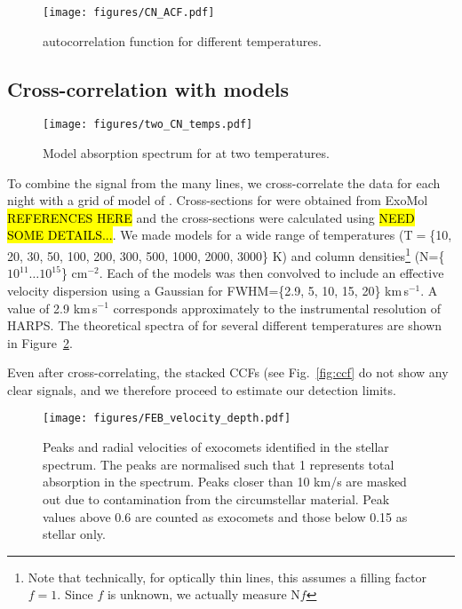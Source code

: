 \documentclass{aa}
\begin{document}
\begin{figure}
    \begin{centering}
        \texttt{[image: figures/CN\_ACF.pdf]}
        \caption{ autocorrelation function for different temperatures.}
        \label{fig:CN_ACF}
    \end{centering}
\end{figure}

\subsection{Cross-correlation with  models}\label{sect:CCF}


\begin{figure}
    \begin{centering}
        \texttt{[image: figures/two\_CN\_temps.pdf]}
        \caption{Model absorption spectrum for  at two temperatures.}
        \label{fig:CN_theory}
    \end{centering}
\end{figure}


To combine the signal from the many  lines, we cross-correlate the data for each night with a grid of model of .
%
Cross-sections for  were obtained from ExoMol \hl{REFERENCES HERE} and the cross-sections were calculated using \hl{NEED SOME DETAILS...}. 
%
We made models for a wide range of temperatures (T$=$\{10, 20, 30, 50, 100, 200, 300, 500, 1000, 2000, 3000\} K) and column densities\footnote{Note that technically, for optically thin lines, this assumes a filling factor $f=1$.
%
Since $f$ is unknown, we actually measure N$f$} (N=\{$10^{11} \ldots 10^{15}$\} cm$^{-2}$.
%
Each of the models was then convolved to include an effective velocity dispersion using a Gaussian for FWHM=\{2.9, 5, 10, 15, 20\} km\,s$^{-1}$.
%
A value of 2.9 km\,s$^{-1}$ corresponds approximately to the instrumental resolution of HARPS.
%
The theoretical spectra of  for several different temperatures are shown in Figure~\ref{fig:CN_theory}.

Even after cross-correlating, the stacked CCFs (see Fig.~\ref{fig:ccf} do not show any clear signals, and we therefore proceed to estimate our detection limits.

\begin{figure}
    \begin{centering}
        \texttt{[image: figures/FEB\_velocity\_depth.pdf]}
        \caption{Peaks and radial velocities of exocomets identified in the stellar spectrum.
        The peaks are normalised such that 1 represents total absorption in the spectrum.
        Peaks closer than 10 km/s are masked out due to contamination from the circumstellar material.
        Peak values above 0.6 are counted as exocomets and those below 0.15 as stellar only.}
        \label{fig:FEB_velocity}
    \end{centering}
\end{figure}
\end{document}
